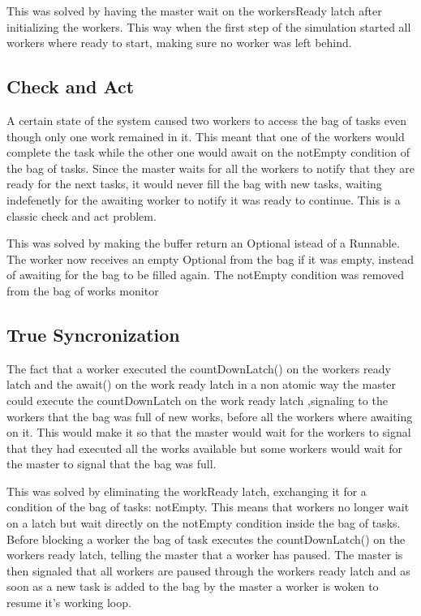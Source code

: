 \documentclass[12pt, a4paper]{report}
\begin{document}
This was solved by having the master wait on the workersReady latch after initializing
 the workers. This way when the first step of the simulation started all workers where
 ready to start, making sure no worker was left behind.

\subsection{Check and Act}
A certain state of the system caused two workers to access the bag of tasks even though
 only one work remained in it. This meant that one of the workers would complete the task
 while the other one would await on the notEmpty condition of the bag of tasks. Since the
 master waits for all the workers to notify that they are ready for the next tasks, it would
 never fill the bag with new tasks, waiting indefenetly for the awaiting worker to notify
 it was ready to continue. This is a classic check and act problem.
 
This was solved by making the buffer return an Optional istead of a Runnable. The worker
 now receives an empty Optional from the bag if it was empty, instead of awaiting for the
 bag to be filled again. The notEmpty condition was removed from the bag of works monitor

\subsection{True Syncronization}
The fact that a worker executed the countDownLatch() on the workers
 ready latch and the await() on the work ready latch in a non atomic way
 the master could execute the countDownLatch on the work ready latch ,signaling
 to the workers that the bag was full of new works, before
 all the workers where awaiting on it. This would make it so that the master would
 wait for the workers to signal that they had executed all the works available but
 some workers would wait for the master to signal that the bag was full.

This was solved by eliminating the workReady latch, exchanging it for a condition
 of the bag of tasks: notEmpty. This means that workers no longer wait on a latch
 but wait directly on the notEmpty condition inside the bag of tasks. Before blocking
 a worker the bag of task executes the countDownLatch() on the workers ready latch,
 telling the master that a worker has paused. The master is then signaled that all
 workers are paused through the workers ready latch and as soon as a new task is added
 to the bag by the master a worker is woken to resume it's working loop.
\end{document}
